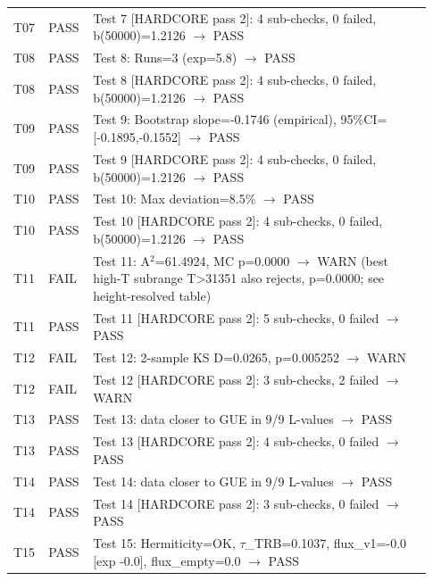 \documentclass[10pt]{article}
\begin{document}
\begin{longtable}{p{0.06\linewidth} p{0.09\linewidth} p{0.78\linewidth}}
T07 & PASS & Test 7 [HARDCORE pass 2]: 4 sub-checks, 0 failed, b(50000)=1.2126 $\rightarrow$ PASS \\

T08 & PASS & Test 8: Runs=3 (exp=5.8) $\rightarrow$ PASS \\

T08 & PASS & Test 8 [HARDCORE pass 2]: 4 sub-checks, 0 failed, b(50000)=1.2126 $\rightarrow$ PASS \\

T09 & PASS & Test 9: Bootstrap slope=-0.1746 (empirical), 95\%CI=[-0.1895,-0.1552] $\rightarrow$ PASS \\

T09 & PASS & Test 9 [HARDCORE pass 2]: 4 sub-checks, 0 failed, b(50000)=1.2126 $\rightarrow$ PASS \\

T10 & PASS & Test 10: Max deviation=8.5\% $\rightarrow$ PASS \\

T10 & PASS & Test 10 [HARDCORE pass 2]: 4 sub-checks, 0 failed, b(50000)=1.2126 $\rightarrow$ PASS \\

T11 & FAIL & Test 11: A$^2$=61.4924, MC p=0.0000 $\rightarrow$ WARN (best high-T subrange T>31351 also rejects, p=0.0000; see height-resolved table) \\

T11 & PASS & Test 11 [HARDCORE pass 2]: 5 sub-checks, 0 failed $\rightarrow$ PASS \\

T12 & FAIL & Test 12: 2-sample KS D=0.0265, p=0.005252 $\rightarrow$ WARN \\

T12 & FAIL & Test 12 [HARDCORE pass 2]: 3 sub-checks, 2 failed $\rightarrow$ WARN \\

T13 & PASS & Test 13: data closer to GUE in 9/9 L-values $\rightarrow$ PASS \\

T13 & PASS & Test 13 [HARDCORE pass 2]: 4 sub-checks, 0 failed $\rightarrow$ PASS \\

T14 & PASS & Test 14: data closer to GUE in 9/9 L-values $\rightarrow$ PASS \\

T14 & PASS & Test 14 [HARDCORE pass 2]: 3 sub-checks, 0 failed $\rightarrow$ PASS \\

T15 & PASS & Test 15: Hermiticity=OK, $\tau$\_TRB=0.1037, flux\_v1=-0.0 [exp -0.0], flux\_empty=0.0 $\rightarrow$ PASS \\


\end{longtable}
\end{document}
